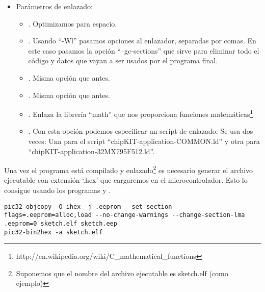 \begin{itemize}
	\begin{itemize}
		\item {}. Este macro define la frecuencia a la que funciona el procesador. En este caso ``80000000L''.
		\item {}. Definimos el macro ``ARDUINO'' con valor 1.
		\item {}.Definimos el macro ``\_BOARD\_MEGA\_'' con valor 1. Indica que estamos usando una placa con el formato de un Arduino Mega.
		\item {}. Definimos el valor de ``MPIDEVER'', que es ``0x01000305''.
		\item {}. Definimos la versión de  que hemos usado. En nuestro caso es la versión 23.
	\end{itemize}
	\item Parámetros de enlazado:
		\begin{itemize}
			\item {}. Optimizamos para espacio.
			\item {}. Usando ``-Wl'' pasamos opciones al enlazador, separadas por comas. En este caso pasamos la opción ``--gc-sections'' que sirve para eliminar todo el código y datos que vayan a ser usados por el programa final.
			\item {}. Misma opción que antes.
			\item {}. Misma opción que antes.
			\item {}. Enlaza la librería ``math'' que nos proporciona funciones matemáticas\footnote{http://en.wikipedia.org/wiki/C\_mathematical\_functions}
			\item {}. Con esta opción podemos especificar un script de enlazado. Se usa dos veces: Una para el script ``chipKIT-application-COMMON.ld'' y otra para ``chipKIT-application-32MX795F512.ld''.
		\end{itemize}
\end{itemize}

Una vez el programa está compilado y enlazado\footnote{Suponemos que el nombre del archivo ejecutable es sketch.elf (como ejemplo)} es necesario generar el archivo ejecutable con extensión `.hex' que cargaremos en el microcontrolador. Esto lo consigue  usando los programas  y .
\begin{lstlisting}[breaklines=true]
pic32-objcopy -O ihex -j .eeprom --set-section-flags=.eeprom=alloc,load --no-change-warnings --change-section-lma .eeprom=0 sketch.elf sketch.eep
pic32-bin2hex -a sketch.elf
\end{lstlisting}

